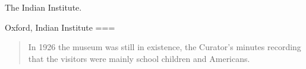 The Indian Institute.

Oxford, Indian Institute
===
\begin{quote}
In 1926 the museum was still in existence, the Curator’s minutes recording that the visitors were mainly school children and Americans.
\end{quote}
\nocite{evison2004}